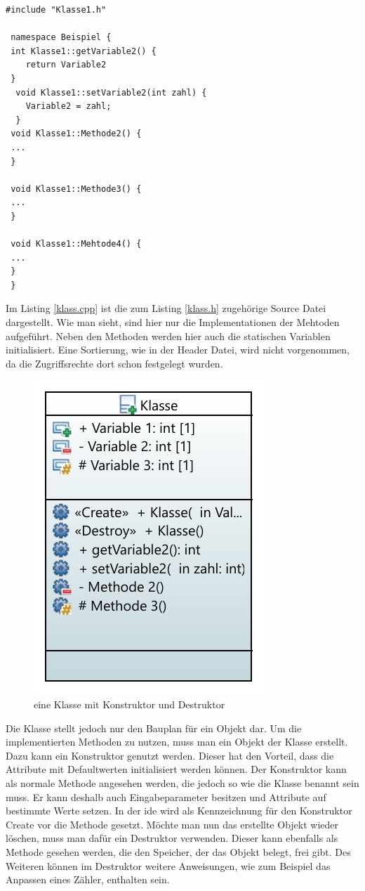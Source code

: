  \begin{lstlisting}[caption = Klasse.cpp,label=klass.cpp]
 #include "Klasse1.h"
 
 namespace Beispiel {
 int Klasse1::getVariable2() {
 	return Variable2
 }
  void Klasse1::setVariable2(int zahl) {
  	Variable2 = zahl;
  }
 void Klasse1::Methode2() {
 ...
 }
  
 void Klasse1::Methode3() {
 ...
 }
   
 void Klasse1::Mehtode4() {
 ...
 }
 }
 \end{lstlisting}
 Im Listing \ref{klass.cpp} ist die zum Listing \ref{klass.h} zugehörige Source Datei dargestellt. Wie man sieht, sind hier nur die Implementationen der Mehtoden aufgeführt. Neben den Methoden werden hier auch die statischen Variablen initialisiert. Eine Sortierung, wie in der Header Datei, wird nicht vorgenommen, da  die Zugriffsrechte dort schon festgelegt wurden. 
  \begin{figure}[H]
  	\centering
  	  	\includegraphics[scale=1.2]{bilder/pdfvorlagen/model2}
  	\caption[eine Klasse mit Konstruktor und Destruktor]{eine Klasse mit Konstruktor und Destruktor}
  	\label{fig:klasseKonstr}
  \end{figure}
Die Klasse stellt jedoch nur den Bauplan für ein Objekt dar. Um die implementierten Methoden zu nutzen, muss man ein Objekt der Klasse erstellt. Dazu kann ein \glqq Konstruktor\grqq{} genutzt werden. Dieser hat den Vorteil, dass die Attribute mit Defaultwerten initialisiert werden können. Der \glqq Konstruktor\grqq{} kann als normale Methode angesehen werden, die jedoch so wie die Klasse benannt sein muss. Er kann deshalb auch Eingabeparameter besitzen und Attribute auf bestimmte Werte setzen. In der \ac{ide} wird als Kennzeichnung für den Konstruktor \glqq Create\grqq{} vor die Methode gesetzt. Möchte man nun das erstellte Objekt wieder löschen, muss man dafür ein  \glqq Destruktor\grqq{} verwenden. Dieser kann ebenfalls als Methode gesehen werden, die den Speicher, der das Objekt belegt, frei gibt. Des Weiteren können im  \glqq Destruktor\grqq{} weitere Anweisungen, wie zum Beispiel das Anpassen eines Zähler, enthalten sein.\\
